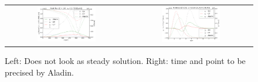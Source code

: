\documentclass[preprint,12pt]{elsarticle}
\newcommand{\figscale}{0.5}
\begin{document}
\begin{figure}[tbh]
  \begin{center}
    \begin{tabular}{cc}
      \includegraphics[width=\figscale\textwidth]{../VFPdata/C7_Aladin_case2_heatflux.png} &
      \includegraphics[width=\figscale\textwidth]{../VFPdata/C7_Aladin_case2_kinetics.png}
    \end{tabular}
  \caption{  
  Left: Does not look as steady solution. Right: time and point to be precised by Aladin.
  }
  \end{center}
  \label{fig:C7_Aladin_case2}
\end{figure}
\end{document}
